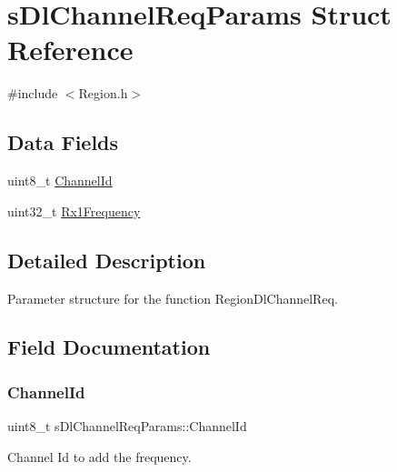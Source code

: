 \hypertarget{structsDlChannelReqParams}{}\section{s\+Dl\+Channel\+Req\+Params Struct Reference}
\label{structsDlChannelReqParams}


{\ttfamily \#include $<$Region.\+h$>$}

\subsection*{Data Fields}
\begin{DoxyCompactItemize}
\item 
uint8\+\_\+t \hyperlink{structsDlChannelReqParams_ac9b1593479ebc7db1803487c0a7419a9}{Channel\+Id}
\item 
uint32\+\_\+t \hyperlink{structsDlChannelReqParams_a69a02b4124668c9c5298f746b040c453}{Rx1\+Frequency}
\end{DoxyCompactItemize}


\subsection{Detailed Description}
Parameter structure for the function Region\+Dl\+Channel\+Req. 

\subsection{Field Documentation}
\mbox{\label{structsDlChannelReqParams_ac9b1593479ebc7db1803487c0a7419a9}} 
\subsubsection{\texorpdfstring{Channel\+Id}{ChannelId}}
{\footnotesize\ttfamily uint8\+\_\+t s\+Dl\+Channel\+Req\+Params\+::\+Channel\+Id}

Channel Id to add the frequency. \mbox{\label{structsDlChannelReqParams_a69a02b4124668c9c5298f746b040c453}} 
